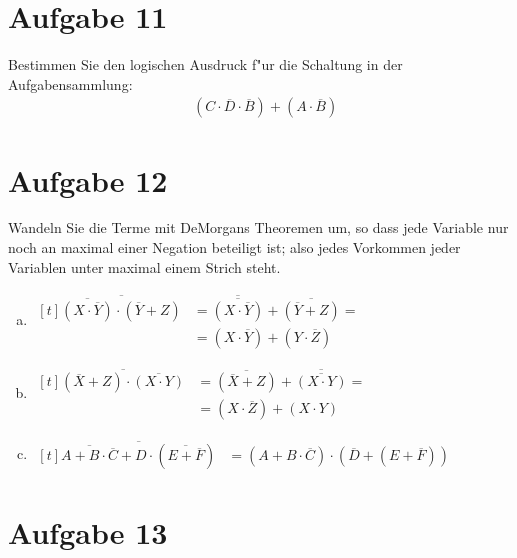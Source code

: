 \documentclass[10pt, oneside]{article}
\begin{document}
\section{Aufgabe 11}

Bestimmen Sie den logischen Ausdruck f"ur die Schaltung in der Aufgabensammlung:
\begin{align*}
       &(C \cdot \overline{D} \cdot \overline{B}) + (A \cdot \overline{B})
\end{align*}

\section{Aufgabe 12}

Wandeln Sie die Terme mit DeMorgans Theoremen um, so dass jede Variable nur
noch an maximal einer Negation beteiligt ist; also jedes Vorkommen jeder
Variablen unter maximal einem Strich steht.
\begin{enumerate}[(a)]
    \item $\begin{aligned}[t]
            \overline{\overline{(X \cdot \overline{Y})} \cdot (\overline{Y} + Z)} &= \overline{\overline{(X \cdot \overline{Y})}} + \overline{(\overline{Y} + Z)} = \\
                                                                                  &= (X \cdot \overline{Y}) + (Y \cdot \overline{Z})
        \end{aligned}$
    \item $\begin{aligned}[t]
            \overline{(\overline{X} + Z) \cdot \overline{(X \cdot Y)}} &= \overline{(\overline{X} + Z)} + \overline{\overline{(X \cdot Y)}} = \\
                                                                       &= (X \cdot \overline{Z}) + (X \cdot Y)
        \end{aligned}$
    \item $\begin{aligned}[t]
            \overline{\overline{A + B \cdot \overline{C}} + D \cdot (\overline{E + \overline{F}})} &= (A + B \cdot \overline{C}) \cdot (\overline{D} + (E + \overline{F}))
        \end{aligned}$
\end{enumerate}

\section{Aufgabe 13}
\end{document}
